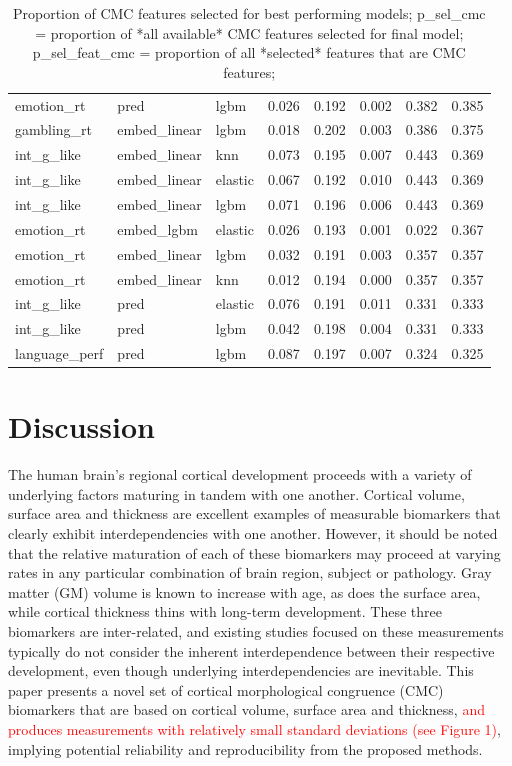 \documentclass{article}
\begin{document}
\begin{table}
\begin{tabular}{lllrrrrr}
	emotion\_rt & pred & lgbm & 0.026 & 0.192 & 0.002 & 0.382 & 0.385 \\
	gambling\_rt & embed\_linear & lgbm & 0.018 & 0.202 & 0.003 & 0.386 & 0.375 \\
	int\_g\_like & embed\_linear & knn & 0.073 & 0.195 & 0.007 & 0.443 & 0.369 \\
	int\_g\_like & embed\_linear & elastic & 0.067 & 0.192 & 0.010 & 0.443 & 0.369 \\
	int\_g\_like & embed\_linear & lgbm & 0.071 & 0.196 & 0.006 & 0.443 & 0.369 \\
	emotion\_rt & embed\_lgbm & elastic & 0.026 & 0.193 & 0.001 & 0.022 & 0.367 \\
	emotion\_rt & embed\_linear & lgbm & 0.032 & 0.191 & 0.003 & 0.357 & 0.357 \\
	emotion\_rt & embed\_linear & knn & 0.012 & 0.194 & 0.000 & 0.357 & 0.357 \\
	int\_g\_like & pred & elastic & 0.076 & 0.191 & 0.011 & 0.331 & 0.333 \\
	int\_g\_like & pred & lgbm & 0.042 & 0.198 & 0.004 & 0.331 & 0.333 \\
	language\_perf & pred & lgbm & 0.087 & 0.197 & 0.007 & 0.324 & 0.325 \\
	\bottomrule
\end{tabular}
\footnotesize
\caption{Proportion of CMC features selected for best performing models;
p\_sel\_cmc = proportion of *all available* CMC features selected for final model;
p\_sel\_feat\_cmc = proportion of all *selected* features that are CMC features;
}
\normalsize
\label{tab:cmc-feature-select}
\end{table}


\section{Discussion}

The human brain's regional cortical development proceeds with a variety of
underlying factors maturing in tandem with one another. Cortical volume,
surface area and thickness are excellent examples of measurable biomarkers
that clearly exhibit interdependencies with one another. However, it should
be noted that the relative maturation of each of these biomarkers may proceed
at varying rates in any particular combination of brain region, subject or
pathology. Gray matter (GM) volume is known to increase with age, as does the
surface area, while cortical thickness thins with long-term development.
These three biomarkers are inter-related, and existing studies focused on
these measurements typically do not consider the inherent interdependence
between their respective development, even though underlying
interdependencies are inevitable. This paper presents a novel set of cortical
morphological congruence (CMC) biomarkers that are based on cortical volume,
surface area and thickness, \textcolor{red}{and produces measurements with
relatively small standard deviations (see Figure 1)}, implying potential
reliability and reproducibility from the proposed methods.
\end{document}
